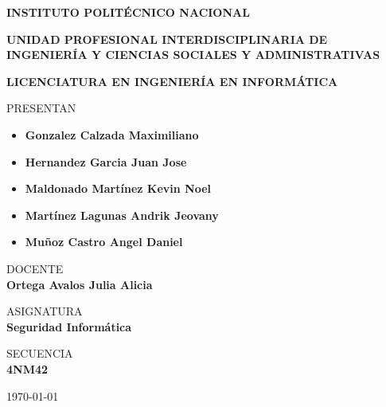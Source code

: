 \documentclass{article}
\begin{document}
	\begin{center}
        \vspace{0.8cm}
        \LARGE
        \textbf{INSTITUTO POLITÉCNICO NACIONAL}
        
        \vspace{0.8cm}
        \LARGE
        \textbf{UNIDAD PROFESIONAL INTERDISCIPLINARIA DE INGENIERÍA Y CIENCIAS SOCIALES Y ADMINISTRATIVAS}
        
        \vspace{1cm}	
        \Large
        \textbf{LICENCIATURA EN INGENIERÍA EN INFORMÁTICA}

        \vspace{1cm}
        \large	
        PRESENTAN \\
        \vspace{.3cm}
        \normalsize
        \begin{itemize}
            \item \textbf{Gonzalez Calzada Maximiliano}
            \item \textbf{Hernandez Garcia Juan Jose}
            \item \textbf{Maldonado Martínez Kevin Noel}
            \item \textbf{Martínez Lagunas Andrik Jeovany}
            \item \textbf{Muñoz Castro Angel Daniel}
        \end{itemize}
        
        \vspace{0.8cm}
        \normalsize	
        DOCENTE \\
        \vspace{.3cm}
        \large
        \textbf{Ortega Avalos Julia Alicia}
        
        \vspace{0.8cm}
        \normalsize	
        ASIGNATURA \\
        \vspace{.3cm}
        \large
        \textbf{Seguridad Informática}

        \vspace{0.8cm}
        \normalsize	
        SECUENCIA \\
        \vspace{.3cm}
        \large
        \textbf{4NM42}
        
        \vspace{0.8cm}
        \today
	\end{center}
	
\end{document}
